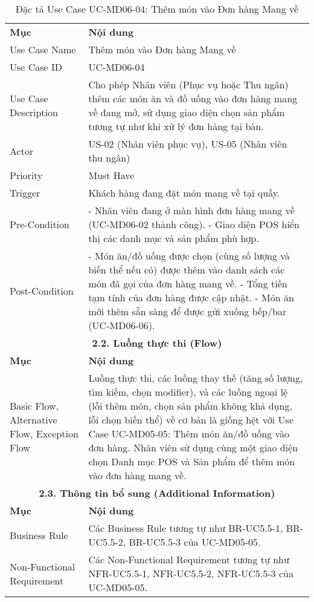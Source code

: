 \begin{longtable}{|m{4cm}|p{11cm}|}
\caption{Đặc tả Use Case UC-MD06-04: Thêm món vào Đơn hàng Mang về} \label{tab:uc_md06_04} \\
\hline

\endhead %
\hline
\endfoot %
\hline
\endlastfoot %
\multicolumn{2}{|c|}{\textbf{2.1. Tóm tắt (Summary)}} \\
\hline
\textbf{Mục} & \textbf{Nội dung} \\
\hline
Use Case Name & Thêm món vào Đơn hàng Mang về \\
\hline
Use Case ID & UC-MD06-04 \\
\hline
Use Case Description & Cho phép Nhân viên (Phục vụ hoặc Thu ngân) thêm các món ăn và đồ uống vào đơn hàng mang về đang mở, sử dụng giao diện chọn sản phẩm tương tự như khi xử lý đơn hàng tại bàn. \\
\hline
Actor & US-02 (Nhân viên phục vụ), US-05 (Nhân viên thu ngân) \\
\hline
Priority & Must Have \\
\hline
Trigger & Khách hàng đang đặt món mang về tại quầy. \\
\hline
Pre-Condition & - Nhân viên đang ở màn hình đơn hàng mang về (UC-MD06-02 thành công). \newline - Giao diện POS hiển thị các danh mục và sản phẩm phù hợp. \\
\hline
Post-Condition & - Món ăn/đồ uống được chọn (cùng số lượng và biến thể nếu có) được thêm vào danh sách các món đã gọi của đơn hàng mang về. \newline - Tổng tiền tạm tính của đơn hàng được cập nhật. \newline - Món ăn mới thêm sẵn sàng để được gửi xuống bếp/bar (UC-MD06-06). \\
\hline
\multicolumn{2}{|c|}{\textbf{2.2. Luồng thực thi (Flow)}} \\
\hline
\textbf{Mục} & \textbf{Nội dung} \\
\hline
Basic Flow, Alternative Flow, Exception Flow & Luồng thực thi, các luồng thay thế (tăng số lượng, tìm kiếm, chọn modifier), và các luồng ngoại lệ (lỗi thêm món, chọn sản phẩm không khả dụng, lỗi chọn biến thể) về cơ bản là giống hệt với Use Case UC-MD05-05: Thêm món ăn/đồ uống vào đơn hàng. Nhân viên sử dụng cùng một giao diện chọn Danh mục POS và Sản phẩm để thêm món vào đơn hàng mang về. \\
\hline
\multicolumn{2}{|c|}{\textbf{2.3. Thông tin bổ sung (Additional Information)}} \\
\hline
\textbf{Mục} & \textbf{Nội dung} \\
\hline
Business Rule & Các Business Rule tương tự như BR-UC5.5-1, BR-UC5.5-2, BR-UC5.5-3 của UC-MD05-05. \\
\hline
Non-Functional Requirement & Các Non-Functional Requirement tương tự như NFR-UC5.5-1, NFR-UC5.5-2, NFR-UC5.5-3 của UC-MD05-05. \\
\hline
\end{longtable}

